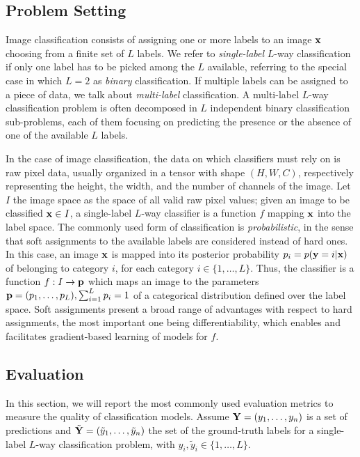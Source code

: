 \subsection{Problem Setting}
\label{subsec:back:classification}
Image classification consists of assigning one or more labels to an image $\mathbf{x}$ choosing from a finite set of $L$ labels.
We refer to \emph{single-label} $L$-way classification if only one label has to be picked among the $L$ available, referring to the special case in which $L=2$ as \emph{binary} classification.
If multiple labels can be assigned to a piece of data, we talk about \emph{multi-label} classification.
A multi-label $L$-way classification problem is often decomposed in $L$ independent binary classification sub-problems, each of them focusing on predicting the presence or the absence of one of the available $L$ labels.

In the case of image classification, the data on which classifiers must rely on is raw pixel data, usually organized in a tensor with shape $(H, W, C)$, respectively representing the height, the width, and the number of channels of the image.
Let $I$ the image space as the space of all valid raw pixel values;
given an image to be classified $\mathbf{x} \in I$, a single-label $L$-way classifier is a function $f$ mapping $\mathbf{x}$ into the label space.
The commonly used form of classification is \emph{probabilistic}, in the sense that soft assignments to the available labels are considered instead of hard ones.
In this case, an image $\mathbf{x}$ is mapped into its posterior probability $p_i = p(\mathbf{y} = i | \mathbf{x})$ of belonging to category $i$, for each category $i \in \{1, \dots, L\}$.
Thus, the classifier is a function $f: I \to \mathbf{p}$ which maps an image to the parameters $\mathbf{p} = (p_1, \ldots, p_L), \sum_{i=1}^L p_i = 1$ of a categorical distribution defined over the label space.
Soft assignments present a broad range of advantages with respect to hard assignments, the most important one being differentiability, which enables and facilitates gradient-based learning of models for $f$.


\subsection{Evaluation}
\label{subsec:back:classif-eval}

In this section, we will report the most commonly used evaluation metrics to measure the quality of classification models.
Assume $\mathbf{Y} = (y_1, \ldots, y_n)$ is a set of predictions and $\tilde{\mathbf{Y}} = (\tilde{y}_1, \ldots, \tilde{y}_n)$ the set of the ground-truth labels for a single-label $L$-way classification problem, with $y_i, \tilde{y}_i \in \{1, \ldots, L\}$. %


